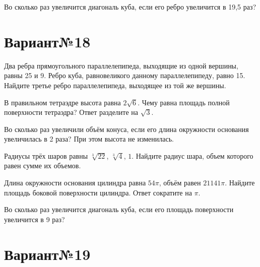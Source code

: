 \documentclass[4apaper]{article}
\begin{document}
\begin{taskBN}{6}
Во сколько раз увеличится диагональ куба, если его ребро увеличится в 19,5 раз?
\end{taskBN}
\newpage\section*{Вариант№18}

\begin{taskBN}{1}
Два ребра прямоугольного параллелепипеда, выходящие из одной вершины, равны 25 и 9. Ребро куба, равновеликого данному параллелепипеду, равно 15. Найдите третье ребро параллелепипеда, выходящее из той же вершины.
\end{taskBN}

\begin{taskBN}{2}
В правильном тетраэдре высота равна $2\sqrt{6}$. Чему равна площадь полной поверхности тетраэдра? Ответ разделите на $\sqrt{3}$.
\end{taskBN}

\begin{taskBN}{3}
Во сколько раз увеличили объём конуса, если его длина окружности основания увеличилась в 2 раза? При этом высота не изменилась.
\end{taskBN}

\begin{taskBN}{4}
Радиусы трёх шаров равны $\sqrt[3]{22}$, $\sqrt[3]{4}$, $1$. Найдите радиус шара, объем которого равен сумме их объемов.
\end{taskBN}

\begin{taskBN}{5}
Длина окружности основания цилиндра равна $54\pi$, объём равен $21141\pi$. Найдите площадь боковой поверхности цилиндра. Ответ сократите на $\pi$.
\end{taskBN}

\begin{taskBN}{6}
Во сколько раз увеличится диагональ куба, если его площадь поверхности увеличится в 9 раз?
\end{taskBN}
\newpage\section*{Вариант№19}
\end{document}
